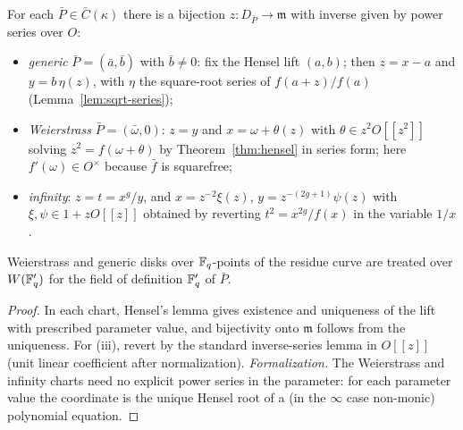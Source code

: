 \begin{lemma}
\label{lem:disk-param}
\leanok
{}
For each $\bar P \in \bar C(\kappa)$ there is a bijection
$z \colon D_{\bar P} \to \mathfrak m$ with inverse given by power series over $O$:
\begin{itemize}
\item[(i)] \emph{generic} $\bar P = (\bar a, \bar b)$ with $\bar b \ne 0$: fix the Hensel
lift $(a,b)$; then $z = x - a$ and $y = b\,\eta(z)$, with $\eta$ the square-root series
of $f(a+z)/f(a)$ (Lemma~\ref{lem:sqrt-series});
\item[(ii)] \emph{Weierstrass} $\bar P = (\bar\omega, 0)$: $z = y$ and
$x = \omega + \theta(z)$ with $\theta \in z^2 O[[z^2]]$ solving $z^2 = f(\omega +
\theta)$ by Theorem~\ref{thm:hensel} in series form; here $f'(\omega) \in O^\times$
because $\bar f$ is squarefree;
\item[(iii)] \emph{infinity}: $z = t = x^g/y$, and $x = z^{-2}\xi(z)$,
$y = z^{-(2g+1)}\psi(z)$ with $\xi, \psi \in 1 + zO[[z]]$ obtained by reverting
$t^2 = x^{2g}/f(x)$ in the variable $1/x$.
\end{itemize}
Weierstrass and generic disks over $\mathbb{F}_q$-points of the residue curve are treated over
$W(\mathbb{F}_q')$ for the field of definition $\mathbb{F}_q'$ of $\bar P$.
\end{lemma}
\begin{proof}
\leanok
In each chart, Hensel's lemma gives existence and uniqueness of the lift with prescribed
parameter value, and bijectivity onto $\mathfrak m$ follows from the uniqueness. For
(iii), revert by the standard inverse-series lemma in $O[[z]]$ (unit linear coefficient
after normalization). \emph{Formalization.} The Weierstrass and infinity charts need no
explicit power series in the parameter: for each parameter value the coordinate is the
unique Hensel root of a (in the $\infty$ case non-monic) polynomial equation.
\end{proof}

